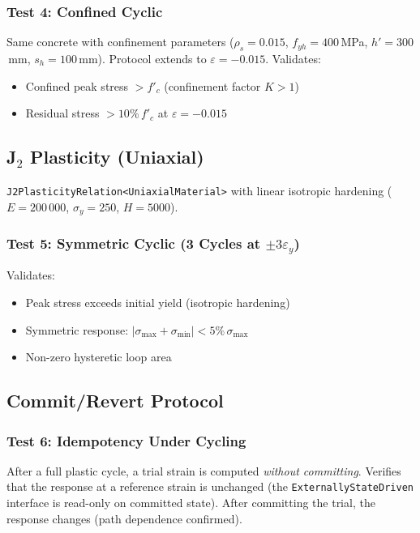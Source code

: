 \subsubsection*{Test 4: Confined Cyclic}

Same concrete with confinement parameters
($\rho_s = 0.015$, $f_{yh} = 400$\,MPa, $h' = 300$\,mm, $s_h = 100$\,mm).
Protocol extends to $\varepsilon = -0.015$.  Validates:

\begin{itemize}
  \item Confined peak stress $> f'_c$ (confinement factor $K > 1$)
  \item Residual stress $> 10\%\,f'_c$ at $\varepsilon = -0.015$
\end{itemize}

\subsection{J$_2$ Plasticity (Uniaxial)}

\texttt{J2PlasticityRelation<UniaxialMaterial>} with linear isotropic
hardening ($E = 200\,000$, $\sigma_y = 250$, $H = 5000$).

\subsubsection*{Test 5: Symmetric Cyclic (3 Cycles at $\pm 3\varepsilon_y$)}

Validates:
\begin{itemize}
  \item Peak stress exceeds initial yield (isotropic hardening)
  \item Symmetric response: $|\sigma_{\max} + \sigma_{\min}| < 5\%\,\sigma_{\max}$
  \item Non-zero hysteretic loop area
\end{itemize}

\subsection{Commit/Revert Protocol}

\subsubsection*{Test 6: Idempotency Under Cycling}

After a full plastic cycle, a trial strain is computed \emph{without
committing}.  Verifies that the response at a reference strain is
unchanged (the \texttt{ExternallyStateDriven} interface is read-only
on committed state).  After committing the trial, the response changes
(path dependence confirmed).


